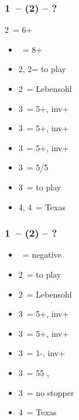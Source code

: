 \documentclass[12pt, a4paper]{article}
\begin{document}
\subsubsection*{1\nt\ -- (2\diams\alrts) -- ?}
2\diams\ = 6+ \major
\begin{itemize}
    \item \dbl\ = 8+
    \item 2\hearts, 2\spades = to play
    \item 2\nt\ = Lebensohl
    \item 3\clubs\ = 5+\diams, inv+
    \item 3\diams\ = 5+\hearts, inv+
    \item 3\hearts\ = 5+\spades, inv+
    \item 3\spades\ = 5/5 \minor
    \item 3\nt\ = to play
    \item 4\diams, 4\hearts\ = Texas
\end{itemize}


\subsubsection*{1\nt\ -- (2\hearts) -- ?}
\begin{itemize}
    \item \dbl\ = negative
    \item 2\spades\ = to play
    \item 2\nt\ = Lebensohl
    \item 3\clubs\ = 5+\diams, inv+
    \item 3\diams\ = 5+\spades, inv+
    \item 3\hearts\ = 1-\hearts, inv+
    \item 3\spades\ = 55 \minor, \gf
    \item 3\nt\ = no \hearts stopper
    \item 4\hearts\ = Texas
\end{itemize}



\end{document}
